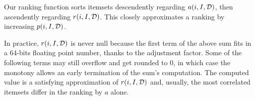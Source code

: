 Our ranking function sorts itemsets descendently regarding $a(i,I,{\cal D})$,
then ascendently regarding $r(i,I,{\cal D})$.
This closely approximates a ranking by increasing $p(i,I,{\cal D})$.

In practice, $r(i,I,{\cal D})$ is never null because
the first term of the above sum fits in a 64-bits floating point number,
thanks to the adjustment factor.
Some of the following terms may still overflow and get rounded to 0,
in which case the monotony allows an early termination of the sum's computation.
The computed value is a satisfying approximation of $r(i,I,{\cal D})$ and,
usually, the most correlated itemsets differ in the ranking by $a$ alone.
